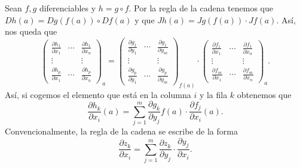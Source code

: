 \begin{observation}
Sean $\displaystyle f,g $ diferenciables y $\displaystyle h = g\circ f $. Por la regla de la cadena tenemos que $\displaystyle Dh\left(a\right)=Dg\left(f\left(a\right)\right)\circ Df\left(a\right) $ y que $\displaystyle Jh\left(a\right)=Jg\left(f\left(a\right)\right) \cdot Jf\left(a\right) $. Así, nos queda que
\[\begin{pmatrix} \frac{\partial h_{1}}{\partial x_{1}} & \cdots & \frac{\partial h_{1}}{\partial x_{n}} \\ \vdots & & \vdots \\ \frac{\partial h_{p}}{\partial x_{1}} & \cdots & \frac{\partial h_{p}}{\partial x_{n}} \end{pmatrix}_{a}= \begin{pmatrix} \frac{\partial g_{1}}{\partial y_{1}} & \cdots & \frac{\partial g_{1}}{\partial y_{m}} \\ \vdots & & \vdots \\ \frac{\partial g_{p}}{\partial y_{1}} & \cdots & \frac{\partial g_{p}}{\partial y_{m}} \end{pmatrix}_{f\left(a\right)}
\cdot \begin{pmatrix} \frac{\partial f_{1}}{\partial x_{1}} & \cdots & \frac{\partial f_{1}}{\partial x_{n}} \\ 
\vdots & & \vdots \\ 
\frac{\partial f_{m}}{\partial x_{1}} & \cdots & \frac{\partial f_{m}}{\partial x_{n}}\end{pmatrix}_{a}.\]
Así, si cogemos el elemento que está en la columna $\displaystyle i $ y la fila $\displaystyle k $ obtenemos que 
\[\frac{\partial h_{k}}{\partial x_{i}}\left(a\right) = \sum^{m}_{j = 1}\frac{\partial g_{k}}{\partial y_{j}}f\left(a\right) \cdot \frac{\partial f_{j}}{\partial x_{i}}\left(a\right) .\]
Convencionalmente, la regla de la cadena se escribe de la forma
\[\frac{\partial z_{k}}{\partial x_{i}} = \sum^{m}_{ j= 1}\frac{\partial z_{k}}{\partial y_{j}} \cdot \frac{\partial y_{j}}{\partial x_{i}} .\]
\end{observation}
